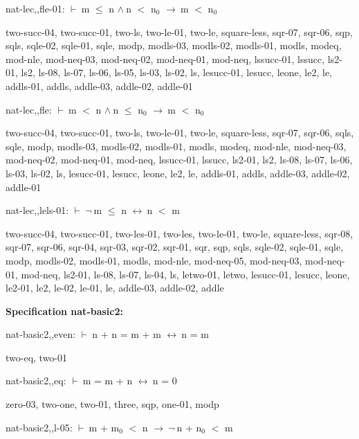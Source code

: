 \documentclass[a4paper]{article}
\newcommand{\Fol}{\mbox{$\vdash\ $}}
\newcommand{\Not}{\mbox{$\neg\ $}}
\newcommand{\And}{\mbox{$\wedge\ $}}
\newcommand{\Imp}{\mbox{$\rightarrow\ $}}
\newcommand{\Equiv}{\mbox{$\leftrightarrow\ $}}
\begin{document}
\bigskip

nat-lec,,fle-01: 
 \Fol m $\le$ n \And n $<$ $\mbox{n}_{0}$ \Imp m $<$ $\mbox{n}_{0}$



two-succ-04, two-succ-01, two-ls, two-le-01, two-le, square-less, sqr-07, sqr-06, sqp, sqls, sqle-02, sqle-01, sqle, modp, modls-03, modls-02, modls-01, modls, modeq, mod-nle, mod-neq-03, mod-neq-02, mod-neq-01, mod-neq, lssucc-01, lssucc, ls2-01, ls2, ls-08, ls-07, ls-06, ls-05, ls-03, ls-02, ls, lesucc-01, lesucc, leone, le2, le, addls-01, addls, addle-03, addle-02, addle-01

\bigskip

nat-lec,,fle: 
 \Fol m $<$ n \And n $\le$ $\mbox{n}_{0}$ \Imp m $<$ $\mbox{n}_{0}$



two-succ-04, two-succ-01, two-ls, two-le-01, two-le, square-less, sqr-07, sqr-06, sqls, sqle, modp, modls-03, modls-02, modls-01, modls, modeq, mod-nle, mod-neq-03, mod-neq-02, mod-neq-01, mod-neq, lssucc-01, lssucc, ls2-01, ls2, ls-08, ls-07, ls-06, ls-03, ls-02, ls, lesucc-01, lesucc, leone, le2, le, addls-01, addls, addle-03, addle-02, addle-01

\bigskip

nat-lec,,lels-01: 
 \Fol \Not m $\le$ n \Equiv n $<$ m



two-succ-04, two-succ-01, two-les-01, two-les, two-le-01, two-le, square-less, sqr-08, sqr-07, sqr-06, sqr-04, sqr-03, sqr-02, sqr-01, sqr, sqp, sqls, sqle-02, sqle-01, sqle, modp, modls-02, modls-01, modls, mod-nle, mod-neq-05, mod-neq-03, mod-neq-01, mod-neq, ls2-01, ls-08, ls-07, ls-04, ls, letwo-01, letwo, lesucc-01, lesucc, leone, le2-01, le2, le-02, le-01, le, addle-03, addle-02, addle

\bigskip

{\bf Specification nat-basic2:}

nat-basic2,,even: 
 \Fol n + n = m + m \Equiv n = m



two-eq, two-01

\bigskip

nat-basic2,,eq: 
 \Fol m = m + n \Equiv n = 0



zero-03, two-one, two-01, three, sqp, one-01, modp

\bigskip

nat-basic2,,l-05: 
 \Fol m + $\mbox{m}_{0}$ $<$ n \Imp \Not n + $\mbox{n}_{0}$ $<$ m
\end{document}
